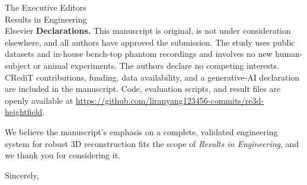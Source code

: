 \documentclass[12pt]{letter}
\begin{document}
\begin{letter}{The Executive Editors\\
Results in Engineering\\
Elsevier}
\textbf{Declarations.}
This manuscript is original, is not under consideration elsewhere, and all authors have approved the submission. The study uses public datasets and in-house bench-top phantom recordings and involves no new human-subject or animal experiments. The authors declare no competing interests. CRediT contributions, funding, data availability, and a generative-AI declaration are included in the manuscript. Code, evaluation scripts, and result files are openly available at \url{https://github.com/liranyang123456-commits/re3d-heightfield}.

We believe the manuscript's emphasis on a complete, validated engineering system for robust 3D reconstruction fits the scope of \textit{Results in Engineering}, and we thank you for considering it.

\closing{Sincerely,}

\end{letter}
\end{document}
